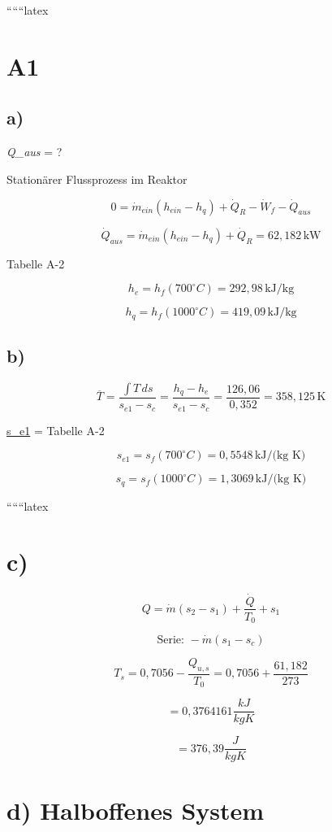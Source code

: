 
``````latex


\section*{A1}

\subsection*{a)}
\textit{Q\_aus} = ?

Stationärer Flussprozess im Reaktor

\[
0 = \dot{m}_{ein} (h_{ein} - h_{q}) + \dot{Q}_R - \dot{W}_f - \dot{Q}_{aus}
\]

\[
\dot{Q}_{aus} = \dot{m}_{ein} (h_{ein} - h_{q}) + \dot{Q}_R = 62,182 \, \text{kW}
\]

Tabelle A-2

\[
h_e = h_f (700^\circ C) = 292,98 \, \text{kJ/kg}
\]

\[
h_q = h_f (1000^\circ C) = 419,09 \, \text{kJ/kg}
\]

\subsection*{b)}

\[
\overline{T} = \frac{\int T \, ds}{s_{e1} - s_c} = \frac{h_q - h_e}{s_{e1} - s_c} = \frac{126,06}{0,352} = 358,125 \, \text{K}
\]

\underline{s_{e1}} = Tabelle A-2

\[
s_{e1} = s_f (700^\circ C) = 0,5548 \, \text{kJ/(kg K)}
\]

\[
s_q = s_f (1000^\circ C) = 1,3069 \, \text{kJ/(kg K)}
\]

``````latex


\section*{c)}

\[
Q = \dot{m} (s_2 - s_1) + \frac{\dot{Q}}{T_0} + s_1
\]

\[
\text{Serie: } - \dot{m} (s_1 - s_c)
\]

\[
T_s = 0,7056 - \frac{Q_{u,s}}{T_0} = 0,7056 + \frac{61,182}{273}
\]

\[
= 0,3764161 \frac{kJ}{kgK}
\]

\[
= 376,39 \frac{J}{kgK}
\]

\section*{d) Halboffenes System}

